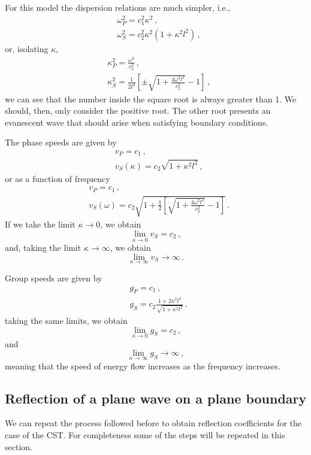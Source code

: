 \documentclass[12pt]{article}
\begin{document}
For this model the dispersion relations are much simpler, i.e.,
\begin{align*}
&\omega_P^2 = c_1^2 \kappa^2\, ,\\
&\omega_S^2 = c_2^2 \kappa^2 (1 + \kappa^2 l^2)\, ,
\end{align*}
or, isolating \(\kappa\),
\begin{align*}
&\kappa_P^2 = \frac{\omega^2}{c_2^2}\, ,\\
&\kappa_S^2 = \frac{1}{2 l^2}\left[\pm\sqrt{1 + \frac{4\omega^2 l^2}{c_2^2}} - 1\right]\, ,
\end{align*}
we can see that the number inside the square root is always greater than 1. We should, then, only consider the positive root. The other root presents an evanescent wave that should arise when satisfying boundary conditions.

The phase speeds are given by
\begin{align*}
&v_P = c_1\, ,\\
&v_S(\kappa) = c_2\sqrt{1 + \kappa^2 l^2}\, ,
\end{align*}
or as a function of frequency
\begin{align*}
&v_P = c_1\, ,\\
&v_S(\omega) = c_2\sqrt{1 + \frac{1}{2}\left[\sqrt{1 + \frac{4\omega^2 l^2}{c_2^2}} - 1\right]}\, .
\end{align*}
If we take the limit \(\kappa \rightarrow 0\), we obtain
\[\lim_{\kappa \rightarrow 0} v_S = c_2\, ,\]
and, taking the limit \(\kappa \rightarrow \infty\), we obtain
\[\lim_{\kappa \rightarrow \infty} v_S \rightarrow  \infty\, .\]

Group speeds are given by
\begin{align*}
&g_P = c_1\, ,\\
&g_S = c_2 \frac{1 + 2\kappa^2 l^2}{\sqrt{1 + \kappa^2 l^2}}\, ,
\end{align*}
taking the same limits, we obtain
\[\lim_{\kappa \rightarrow 0} g_S = c_2\, ,\]
and
\[\lim_{\kappa \rightarrow \infty} g_S \rightarrow  \infty\, ,\]
meaning that the speed of energy flow increases as the frequency increases.

\subsection{Reflection of a plane wave on a plane boundary}

We can repeat the process followed before to obtain reflection coefficients for the case of the CST. For completeness some of the steps will be repeated in this section.
\end{document}
